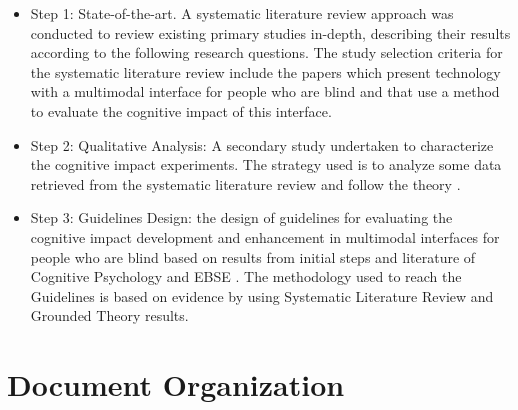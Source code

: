 \begin{itemize}
\item Step 1: State-of-the-art. A systematic literature review approach \cite{Kitchenham2007} was conducted to review existing primary studies in-depth, describing their results according to the following research questions. The study selection  criteria for the systematic literature review include the papers which present technology with a multimodal interface for people who are blind and that use a method to evaluate the cognitive impact of this interface.
\item Step 2: Qualitative Analysis: A secondary study undertaken to characterize the cognitive impact experiments. The strategy used is to analyze some data retrieved from the systematic literature review and follow the theory \cite{Wuetherick2010}.
\item Step 3: Guidelines Design: the design of guidelines for evaluating the cognitive impact development and enhancement in multimodal interfaces for people who are blind based on results from initial steps and literature of Cognitive Psychology \cite{Sternberg2011,Norman1986a} and \gls{EBSE} \cite{Wohlin2000,Jedlitschka2007,Shepperd2012,AlicynFerrell2006,Shull2008GuideEngineering}. The methodology used to reach the Guidelines is based on evidence by using Systematic Literature Review and Grounded Theory results.
\end{itemize}

 	\begin{figure}[h] 
   	    \captionsetup{width=15cm}%
	\end{figure}


\section{Document Organization}
\label{sec:introduction-organization}

